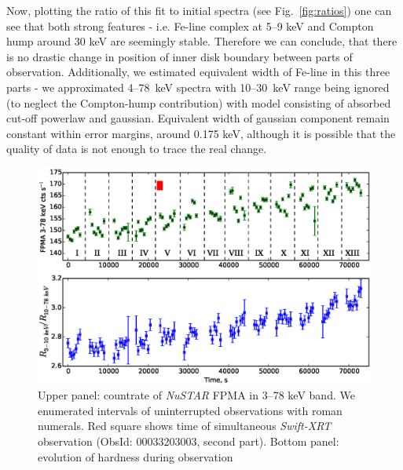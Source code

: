 \documentclass[a4paper,fleqn,usenatbib]{mnras}
\def\swiftx{{\em Swift-XRT\,}}
\def\nustar{{\em NuSTAR\,}}
\begin{document}
Now, plotting the ratio of this fit to initial spectra (see Fig.~\ref{fig:ratios}) one can see that both strong features - i.e. Fe-line complex at 5--9 keV and Compton hump around 30 keV are seemingly stable. Therefore we can conclude, that there is no drastic change in position of inner disk boundary between parts of observation. Additionally, we estimated equivalent width of Fe-line in this three parts - we approximated 4--78~keV spectra with 10--30~keV range being ignored (to neglect the Compton-hump contribution) with model consisting of absorbed cut-off powerlaw and gaussian. Equivalent width of gaussian component remain constant within error margins, around 0.175 keV, although it is possible that the quality of data is not enough to trace the real change.

\begin{figure}
\centerline{\includegraphics[scale=0.7]{nuAlc_color_v04.eps}}
\caption{Upper panel: countrate of \nustar\,FPMA in 3--78 keV band. We enumerated intervals of uninterrupted observations with roman numerals. Red square shows time of simultaneous \swiftx observation (ObsId: 00033203003, second part). Bottom panel: evolution of hardness during observation} 
\label{fig:nust_lc}
\end{figure} 
\end{document}
